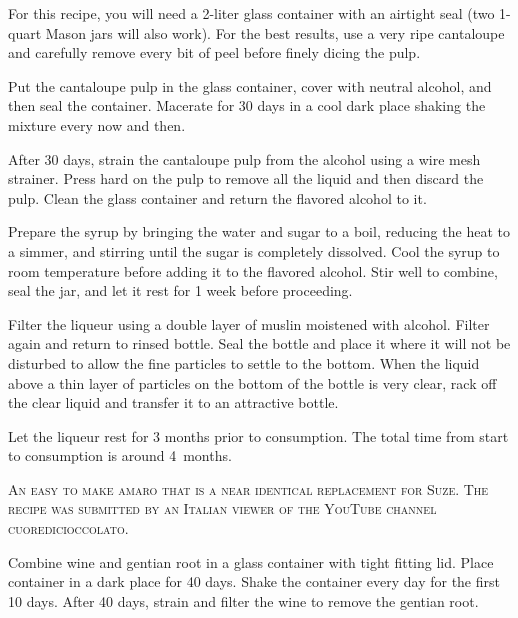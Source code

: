 \documentclass[letterpaper]{recipePMG}
\newcommand{\half}{\nicefrac{1}{2} \,}
\newcommand{\headnote}{\textsc}
\begin{document}

For this recipe, you will need a 2-liter glass container with an airtight seal (two 1-quart Mason jars will also work). For the best results, use a very ripe cantaloupe and carefully remove every bit of peel before finely dicing the pulp.

Put the cantaloupe pulp in the glass container, cover with neutral alcohol, and then seal the container. Macerate for 30 days in a cool dark place shaking the mixture every now and then.

After 30 days, strain the cantaloupe pulp from the alcohol using a wire mesh strainer.  Press hard on the pulp to remove all the liquid and then discard the pulp. Clean the glass container and return the flavored alcohol to it. 

Prepare the syrup by bringing the water and sugar to a boil, reducing the heat to a simmer, and stirring until the sugar is completely dissolved. Cool the syrup to room temperature before adding it to the flavored alcohol. Stir well to combine, seal the jar, and let it rest for 1 week before proceeding.

Filter the liqueur using a double layer of muslin moistened with alcohol. Filter again and return to rinsed bottle. Seal the bottle and place it where it will not be disturbed to allow the fine particles to settle to the bottom.  When the liquid above a thin layer of particles on the bottom of the bottle is very clear, rack off the clear liquid and transfer it to an attractive bottle.

Let the liqueur rest for 3 months prior to consumption.  The total time from start to consumption is around 4\half months.

\newpage
{}
\label{GenzianaAmaro}

\headnote{An easy to make amaro that is a near identical replacement for Suze. The recipe was submitted by an Italian viewer of the YouTube channel cuoredicioccolato.}


Combine wine and gentian root in a glass container with tight fitting lid.  Place container in a dark place for 40 days. Shake the  container every day for the first 10 days.  After 40 days, strain and filter the wine to remove the gentian root.
\end{document}

